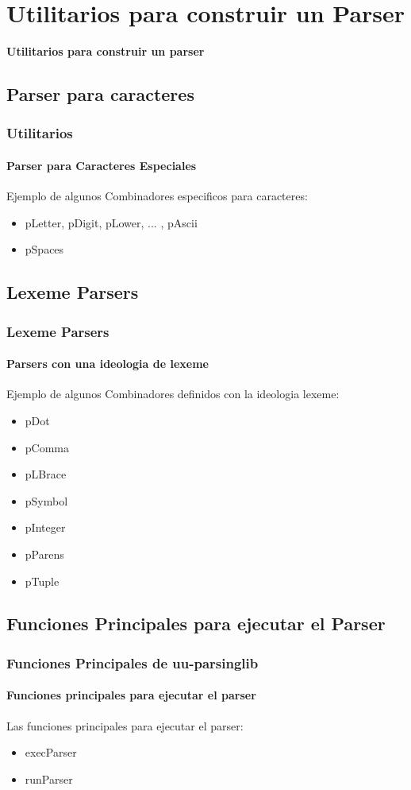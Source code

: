 \documentclass[12pt]{beamer}
\begin{document}
\section[Utilitarios]{Utilitarios para construir un Parser}
\begin{frame}
\begin{center}
	\textbf{\Large Utilitarios para construir un parser}
\end{center}
\end{frame}

\subsection[Caracteres]{Parser para caracteres}
\begin{frame}
\frametitle{Utilitarios}
\framesubtitle{Parser para Caracteres Especiales}
Ejemplo de algunos Combinadores especificos para caracteres:
    \begin{itemize}
        \item pLetter, pDigit, pLower, ... , pAscii
        \item pSpaces
	\end{itemize}
\end{frame}

\subsection[Lexeme]{Lexeme Parsers}
\begin{frame}
\frametitle{Lexeme Parsers}
\framesubtitle{Parsers con una ideologia de lexeme}
Ejemplo de algunos Combinadores definidos con la ideologia lexeme:
    \begin{itemize}
        \item pDot
        \item pComma
        \item pLBrace
        \item pSymbol
        \item pInteger
        \item pParens
        \item pTuple
	\end{itemize}
\end{frame}

\subsection[Func. principales]{Funciones Principales para ejecutar el Parser}
\begin{frame}
\frametitle{Funciones Principales de uu-parsinglib}
\framesubtitle{Funciones principales para ejecutar el parser}
Las funciones principales para ejecutar el parser:
    \begin{itemize}
        \item execParser
        \item runParser
	\end{itemize}
\end{frame}
\end{document}
